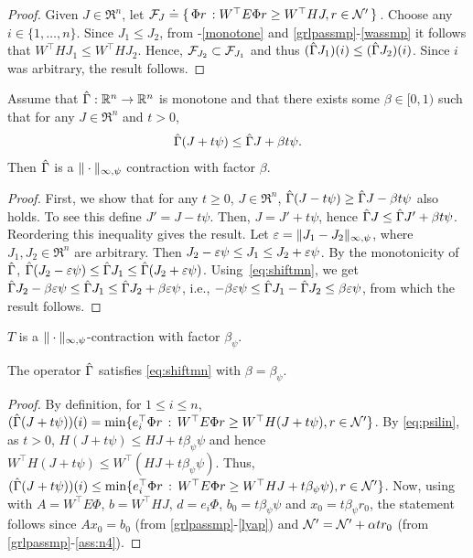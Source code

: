\begin{proof}
Given $J\in \Re^n$, let $\mathcal{F}_J\doteq\{\,\Phi r\,: W^\top E \Phi r\geq W^\top HJ, r\in \mathcal{N}'\,\}\,$. Choose any $i\in \{1, \ldots, n\}$. Since $J_1\leq J_2$, from -\eqref{monotone} and \cref{grlpassmp}-\eqref{wassmp} it follows that $W^\top H J_1\leq W^\top H J_2$. Hence, $\mathcal{F}_{J_2} \subset \mathcal{F}_{J_1}$ and thus $(\hat{\Gamma} J_1)(i) \le (\hat{\Gamma} J_2)(i)$.  Since $i$ was arbitrary, the result follows.
\end{proof}
\begin{lemma}\label{maxnormmn}
Assume that $\hat{\Gamma}: \mathbb{R}^n \to \mathbb{R}^n$ is monotone and 
that there exists some $\beta\in [0,1)$ such that for any $J\in \Re^n$ and $t>0$,
\begin{align}
\label{eq:shiftmn}
\hg( J + t \psi) \le \hg J + \beta t \psi.
\end{align} 
Then $\hat{\Gamma}$ is a $\|\cdot\|_{\infty,\psi}$ contraction with factor $\beta$.
\end{lemma}
\begin{proof}
First, we show that for any $t\ge 0$,  $J\in \Re^n$,
$\hat{\Gamma}( J - t \psi) \ge \hat{\Gamma} J - \beta t \psi$ also holds.
To see this define $J' = J-t\psi$. Then, $J = J'+t\psi$, hence $\hat{\Gamma} J \le \hat{\Gamma} J' + \beta t \psi$. Reordering this inequality gives the result.
Let $\varepsilon = \|J_1 - J_2\|_{\infty,\psi}$, where $J_1,J_2\in \Re^n$ are arbitrary.
Then $J_2 - \varepsilon \psi \le J_1 \le J_2 + \varepsilon \psi$. 
By the monotonicity of $\hat{\Gamma}$,
$\hat{\Gamma}(J_2 - \varepsilon \psi) \le \hat{\Gamma} J_1 \le \hat{\Gamma}(J_2 + \varepsilon \psi)$. 
Using~\eqref{eq:shiftmn}, we get 
$\hat{\Gamma} J_2 - \beta \varepsilon \psi \le \hat{\Gamma} J_1 \le \hat{\Gamma} J_2 + \beta \varepsilon \psi$, i.e., $-\beta \varepsilon \psi \le \hat{\Gamma} J_1 - \hat{\Gamma} J_2 \le \beta \varepsilon \psi$, from which the result follows.
\end{proof}
\begin{corollary}\label{tmaxnormmn}
$T$ is a $\|\cdot\|_{\infty,\psi}$-contraction with factor $\beta_{\psi}$.
\end{corollary}
\begin{lemma}\label{gshiftmn}
The operator $\hat{\Gamma}$ satisfies \eqref{eq:shiftmn} with $\beta = \beta_\psi$.
\end{lemma}
\begin{proof}
By definition, for $1\le i \le n$, $(\hat{\Gamma} (J+t\psi) )(i) = \min\{ e_i^\top \Phi r \,:\, W^\top E\Phi r \ge W^\top H(J+t\psi), r\in \mathcal{N}' \}$.
By \eqref{eq:psilin}, as $t>0$, $H(J+t\psi) \le HJ + t \beta_\psi \psi$ and hence $W^\top H(J+t\psi) \le W^\top (HJ + t \beta_\psi \psi)$. Thus,
$(\hat{\Gamma} (J+t\psi) )(i) \le 
 \min\{ e_i^\top \Phi r \,:\, W^\top E\Phi r \ge W^\top HJ+t\beta_\psi \psi), r\in \mathcal{N}' \}$.
Now, using  with $A=W^\top E \Phi$, $b=W^\top HJ$, $d=e_i\Phi$, $b_0=t\beta_\psi \psi$
and $x_0=t \beta_\psi r_0$, the statement follows since $A x_0 = b_0$ (from \cref{grlpassmp}-\eqref{lyap}) and $\mathcal{N}' = \mathcal{N}' + \alpha t r_0$ (from \cref{grlpassmp}-\eqref{ass:n4}).
\end{proof}
